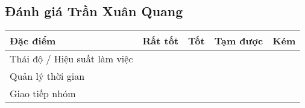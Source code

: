 \documentclass[a4paper,12pt]{article}
\begin{document}
\subsection{Đánh giá Trần Xuân Quang}
\begin{tabularx}{\textwidth}{|X|X|X|X|X|}
\hline
\textbf{Đặc điểm} & \textbf{Rất tốt} & \textbf{Tốt} & \textbf{Tạm được} & \textbf{Kém} \\
\hline
Thái độ / Hiệu suất làm việc &  & & & \\
\hline
Quản lý thời gian & &  & & \\
\hline
Giao tiếp nhóm &  & & & \\
\hline
\end{tabularx}
\end{document}
